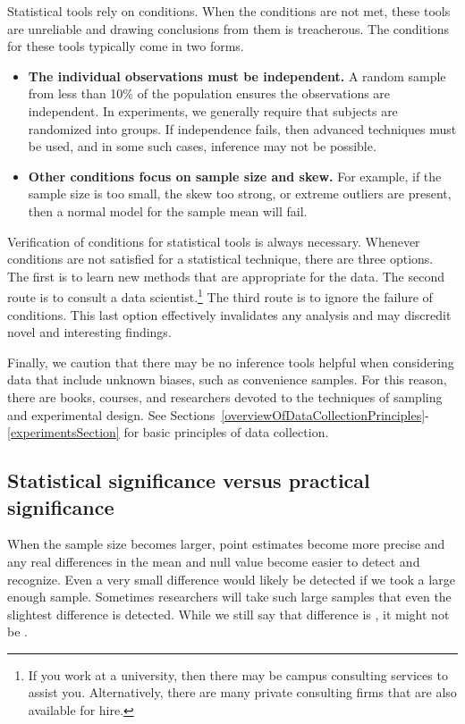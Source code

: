 Statistical tools rely on conditions. When the conditions are not met, these tools are unreliable and drawing conclusions from them is treacherous. The conditions for these tools typically come in two forms.
\begin{itemize}
\setlength{\itemsep}{0mm}
\item \textbf{The individual observations must be independent.} A random sample from less than 10\% of the population ensures the observations are independent. In experiments, we generally require that subjects are randomized into groups. If independence fails, then advanced techniques must be used, and in some such cases, inference may not be possible.
\item \textbf{Other conditions focus on sample size and skew.} For example, if the sample size is too small, the skew too strong, or extreme outliers are present, then a normal model for the sample mean will fail.
\end{itemize}
Verification of conditions for statistical tools is always necessary. Whenever conditions are not satisfied for a statistical technique, there are three options. The first is to learn new methods that are appropriate for the data. The second route is to consult a data scientist.\footnote{If you work at a university, then there may be campus consulting services to assist you. Alternatively, there are many private consulting firms that are also available for hire.} The third route is to ignore the failure of conditions. This last option effectively invalidates any analysis and may discredit novel and interesting findings.

Finally, we caution that there may be no inference tools helpful when considering data that include unknown biases, such as convenience samples. For this reason, there are books, courses, and researchers devoted to the techniques of sampling and experimental design. See Sections~\ref{overviewOfDataCollectionPrinciples}-\ref{experimentsSection} for basic principles of data collection.


\D{\newpage}

\subsection{Statistical significance versus practical significance}

When the sample size becomes larger, point estimates become more precise and any real differences in the mean and null value become easier to detect and recognize. Even a very small difference would likely be detected if we took a large enough sample. Sometimes researchers will take such large samples that even the slightest difference is detected. While we still say that difference is , it might not be .

